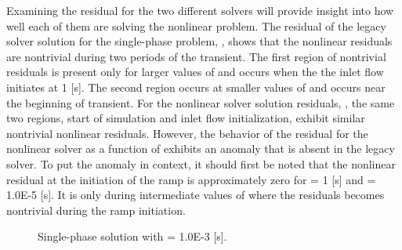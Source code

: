 Examining the residual for the two different solvers will provide insight into how well each of them are solving the nonlinear problem.
The residual of the legacy solver solution for the single-phase problem, , shows that the nonlinear residuals are nontrivial during two periods of the transient.
The first region of nontrivial residuals is present only for larger values of \dtmax{} and occurs when the the inlet flow initiates at 1 [s].
The second region occurs at smaller values of \dtmax{} and occurs near the beginning of transient.
For the nonlinear solver solution residuals, , the same two regions, start of simulation and inlet flow initialization, exhibit similar nontrivial nonlinear residuals.
However, the behavior of the residual for the nonlinear solver as a function of \dtmax{} exhibits an anomaly that is absent in the legacy solver.
To put the anomaly in context, it should first be noted that the nonlinear residual at the initiation of the ramp is approximately zero for \dtmax{} = 1 [s] and \dtmax{} = 1.0E-5 [s].
It is only during intermediate values of \dtmax{} where the residuals becomes nontrivial during the ramp initiation.

\begin{figure}[h!t]
\centering
{}
\caption[Single-phase solution at \dtmax{} = 1.0E-3 {[s]}]{Single-phase solution with \dtmax{} = 1.0E-3 {[s]}.}
\label{fig:single_compare_3}
\end{figure}

